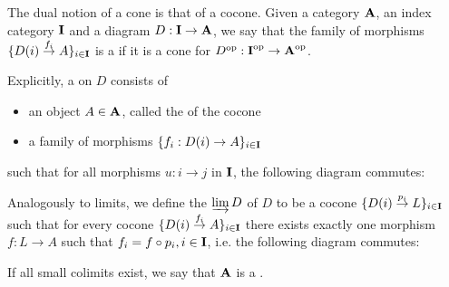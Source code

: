 \begin{definition}\label{def:categorical_cocone}\cite[definition 5.2.1]{Leinster2014}
  The dual notion of a cone is that of a cocone. Given a category \( \operatorname{\mathbf{A}} \), an index category \( \operatorname{\mathbf{I}} \) and a diagram \( D: \operatorname{\mathbf{I}} \to \operatorname{\mathbf{A}} \), we say that the family of morphisms \( \{ D(i) \overset {f_i} \to A \}_{i \in \operatorname{\mathbf{I}}} \) is a  if it is a cone for \( D^{\operatorname{op}}: \operatorname{\mathbf{I}}^{\operatorname{op}} \to \operatorname{\mathbf{A}}^{\operatorname{op}} \).

  Explicitly, a  on \( D \) consists of
  \begin{itemize}
    \item an object \( A \in \operatorname{\mathbf{A}} \), called the  of the cocone
    \item a family of  morphisms \( \{ f_i: D(i) \to A \}_{i \in \operatorname{\mathbf{I}}} \)
  \end{itemize}
  such that for all morphisms \( u: i \to j \) in \( \operatorname{\mathbf{I}} \), the following diagram commutes:
  \begin{Center}
  \end{Center}
\end{definition}

\begin{definition}\label{def:categorical_colimit}\cite[definition 5.1.19(b)]{Leinster2014}
  Analogously to limits, we define the  \( \varinjlim D \) of \( D \) to be a cocone \( \{ D(i) \overset {p_i} \to L \}_{i \in \operatorname{\mathbf{I}}} \) such that for every cocone \( \{ D(i) \overset {f_i} \to A \}_{i \in \operatorname{\mathbf{I}}} \) there exists exactly one morphism \( f: L \to A \) such that \( f_i = f \circ p_i, i \in \operatorname{\mathbf{I}} \), i.e. the following diagram commutes:
  \begin{Center}
  \end{Center}

  If all small colimits exist, we say that \( \operatorname{\mathbf{A}} \) is a .
\end{definition}

